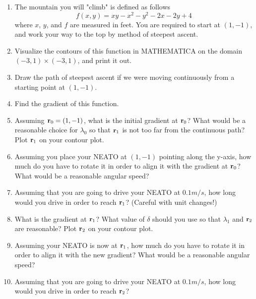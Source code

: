\documentclass[M3_Night4_Solutions]{subfiles}
\begin{document}
\begin{enumerate}[resume=exercises, label=\textbf{Exercise} (\arabic*)]
\be[resume]
\item  The mountain you will "climb" is defined as follows
\[ f(x,y) = xy - x^2 - y^2 -2x -2y + 4 \]
where $x$, $y$, and $f$ are measured in feet. You are required to start at $(1,-1)$, and work your way to the top by method of steepest ascent.
\be
\item Visualize the contours of this function in MATHEMATICA on the domain $(-3,1) \times (-3,1)$, and print it out. 
\item Draw the path of steepest ascent if we were moving continuously from a starting point at $(1,-1)$.  
\item Find the gradient of this function.
\item Assuming $\mathbf{r}_0 = (1,-1)$, what is the initial gradient at $\mathbf{r}_0$? What would be a reasonable choice for $\lambda_0$ so that $\mathbf{r}_1$ is not too far from the continuous path? Plot $\mathbf{r}_1$ on your contour plot.
\item Assuming you place your NEATO at $(1,-1)$ pointing along the y-axis, how much do you have to rotate it in order to align it with the gradient at $\mathbf{r}_0$? What would be a reasonable angular speed?
\item Assuming that you are going to drive your NEATO at $0.1 m/s$, how long would you drive in order to reach $\mathbf{r}_1$? (Careful with unit changes!)
\item What is the gradient at $\mathbf{r}_1$? What value of $\delta$ should you use so that $\lambda_1$ and $\mathbf{r}_2$ are reasonable? Plot $\mathbf{r}_2$ on your contour plot.
\item Assuming your NEATO is now at $\mathbf{r}_1$, how much do you have to rotate it in order to align it with the new gradient? What would be a reasonable angular speed?
\item Assuming that you are going to drive your NEATO at $0.1 m/s$, how long would you drive in order to reach $\mathbf{r}_2$?
\ee
\ee


\end{enumerate}
\end{document}
